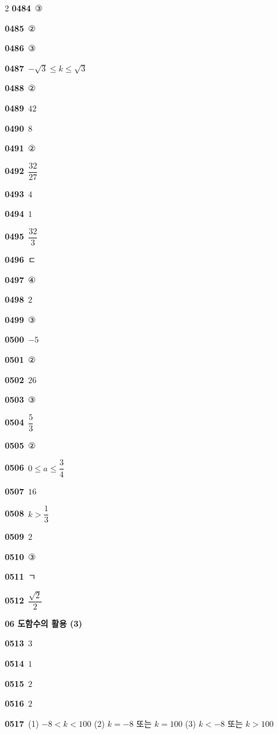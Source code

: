 \documentclass[10pt,a4paper]{article}
\begin{document}
\begin{multicols}{2}
\noindent\textbf{0484}\ ③\par
\noindent\textbf{0485}\ ②\par
\noindent\textbf{0486}\ ③\par
\noindent\textbf{0487}\ $-\sqrt{3}\le k\le \sqrt{3}$\par
\noindent\textbf{0488}\ ②\par
\noindent\textbf{0489}\ $42$\par
\noindent\textbf{0490}\ $8$\par
\noindent\textbf{0491}\ ②\par
\noindent\textbf{0492}\ $\dfrac{32}{27}$\par
\noindent\textbf{0493}\ $4$\par
\noindent\textbf{0494}\ $1$\par
\noindent\textbf{0495}\ $\dfrac{32}{3}$\par
\noindent\textbf{0496}\ ㄷ\par
\noindent\textbf{0497}\ ④\par
\noindent\textbf{0498}\ $2$\par
\noindent\textbf{0499}\ ③\par
\noindent\textbf{0500}\ $-5$\par
\noindent\textbf{0501}\ ②\par
\noindent\textbf{0502}\ $26$\par
\noindent\textbf{0503}\ ③\par
\noindent\textbf{0504}\ $\dfrac{5}{3}$\par
\noindent\textbf{0505}\ ②\par
\noindent\textbf{0506}\ $0\le a\le \dfrac{3}{4}$\par
\noindent\textbf{0507}\ $16$\par
\noindent\textbf{0508}\ $k>\dfrac{1}{3}$\par
\noindent\textbf{0509}\ $2$\par
\noindent\textbf{0510}\ ③\par
\noindent\textbf{0511}\ ㄱ\par
\noindent\textbf{0512}\ $\dfrac{\sqrt{2}}{2}$\par
\noindent\textbf{06 도함수의 활용 (3)}\par\smallskip
\noindent\textbf{0513}\ $3$\par
\noindent\textbf{0514}\ $1$\par
\noindent\textbf{0515}\ $2$\par
\noindent\textbf{0516}\ $2$\par
\noindent\textbf{0517}\ (1) $-8<k<100$ \quad (2) $k=-8$ 또는 $k=100$ \quad (3) $k<-8$ 또는 $k>100$\par

\end{multicols}
\end{document}
